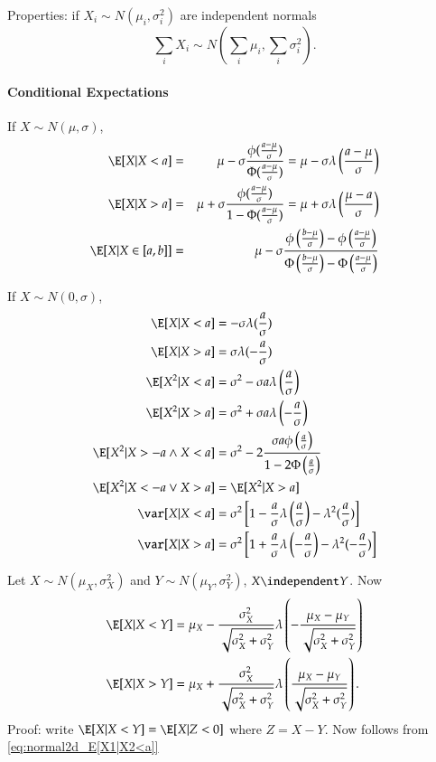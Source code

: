 \documentclass[a4paper]{article}
\numberwithin{equation}{subsection}
\begin{document}
Properties: if $X_{i} \sim N(\mu_{i}, \sigma_{i}^{2})$ are
independent normals
\begin{equation}
  \sum_{i} X_{i} \sim 
  N \left(\sum_{i} \mu_{i}, \sum_{i} \sigma_{i}^{2} \right).
\end{equation}

\paragraph{Conditional Expectations}
If $X \sim N(\mu, \sigma)$, 
\begin{eqnarray}
\E [X|X < a ]
&=&
 \mu - \sigma \frac {\phi( \frac{a - \mu}{\sigma} )} {\Phi(
   \frac{a - \mu}{\sigma})}
 =
 \mu - \sigma\lambda \left( \frac{a - \mu}{\sigma} \right)
\\
\E [X|X>a ]
&=&
\mu + \sigma \frac {\phi( \frac{a - \mu}{\sigma} )} 
{1 - \Phi(\frac{a - \mu}{\sigma})}
=
\mu + \sigma \lambda \left( \frac{ \mu - a}{\sigma} \right)
\\
\E [X|X \in [a,b]]
&=&
 \mu - \sigma \frac
 {\phi \left( \frac{b - \mu}{\sigma} \right) - 
   \phi\left( \frac{a - \mu}{\sigma}\right)}
 {\Phi\left(\frac{b - \mu}{\sigma}\right) - 
   \Phi\left(\frac{a - \mu}{\sigma}\right)}
\end{eqnarray}

If $X \sim N(0, \sigma)$, 
\begin{align}
\E[X|X<a]
 &=
 -\sigma \lambda(\frac{a}{\sigma})
\\
\E[X|X>a] 
&=
\sigma \lambda(-\frac{a}{\sigma})
\\
\E[X^2|X < a]
&=
\sigma^2 - \sigma a \lambda \left(\frac{a}{\sigma} \right)
\\
\E[X^2|X > a]
&=
\sigma^2 + \sigma a \lambda \left(-\frac{a}{\sigma} \right)
\\
\E[X^2|X > -a \land X < a]
&=
\sigma^2 - 
2 \frac{\sigma a \phi\left(\frac{a}{\sigma} \right)}
{1 - 2 \Phi\left(\frac{a}{\sigma} \right)}
\\
\E[X^2|X < -a \lor X > a] 
&=
\E[X^2|X > a]
\\
\var[X|X <a] 
&= 
\sigma^2 \left[1 - 
  \frac{a}{\sigma} \lambda\left(\frac{a}{\sigma}\right) -
  \lambda^2(\frac{a}{\sigma}) \right]
\\
\var[X|X > a] 
&=
\sigma^2 \left[1 + 
  \frac{a}{\sigma} \lambda \left(-\frac{a}{\sigma} \right) - 
  \lambda^2(-\frac{a}{\sigma}) \right] \\
\end{align}

Let $X \sim N(\mu_{X}, \sigma_{X}^{2})$ and $Y \sim N(\mu_{Y},
\sigma_{Y}^{2})$, $X \independent Y$.  Now
\begin{align}
  \E[X|X < Y] 
  &=
  \mu_{X}
  - \frac{\sigma_{X}^{2}}{\sqrt{\sigma_{X}^{2} + \sigma_{Y}^{2}}}
  \lambda\left( -\frac{\mu_{X} - \mu_{Y}}
    {\sqrt{\sigma_{X}^{2} + \sigma_{Y}^{2}}}
    \right)
  \\
  \E[X|X > Y] 
  &=
  \mu_{X}
  + \frac{\sigma_{X}^{2}}{\sqrt{\sigma_{X}^{2} + \sigma_{Y}^{2}}}
  \lambda\left( \frac{\mu_{X} - \mu_{Y}}
    {\sqrt{\sigma_{X}^{2} + \sigma_{Y}^{2}}}
    \right).
\end{align}
Proof: write $\E[X|X < Y] = \E[X|Z < 0]$ where $Z = X-Y$.  Now
follows from \eqref{eq:normal2d_E[X1|X2<a]}
\end{document}
